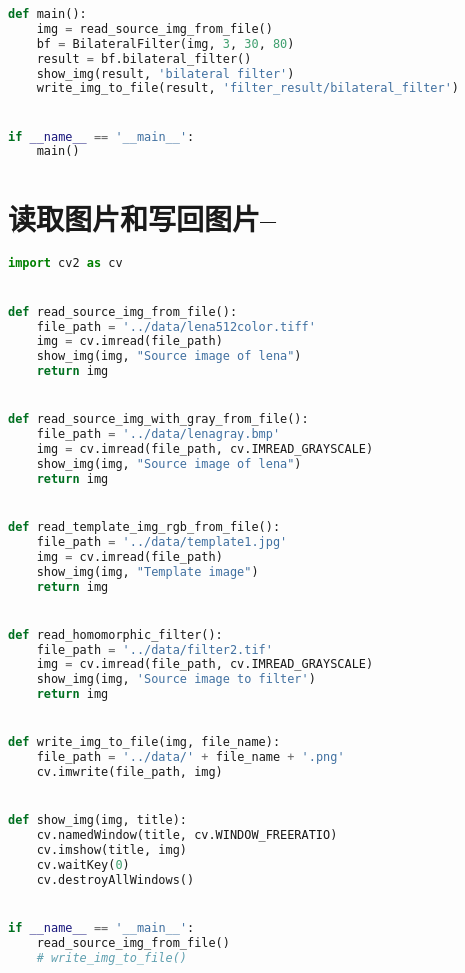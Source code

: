 \documentclass{hitreport}
\begin{document}
\begin{appendices}
\begin{lstlisting}[language=python]
def main():
    img = read_source_img_from_file()
    bf = BilateralFilter(img, 3, 30, 80)
    result = bf.bilateral_filter()
    show_img(result, 'bilateral filter')
    write_img_to_file(result, 'filter_result/bilateral_filter')


if __name__ == '__main__':
    main()

\end{lstlisting}



\section{读取图片和写回图片--}
\begin{lstlisting}[language=python]
import cv2 as cv


def read_source_img_from_file():
    file_path = '../data/lena512color.tiff'
    img = cv.imread(file_path)
    show_img(img, "Source image of lena")
    return img


def read_source_img_with_gray_from_file():
    file_path = '../data/lenagray.bmp'
    img = cv.imread(file_path, cv.IMREAD_GRAYSCALE)
    show_img(img, "Source image of lena")
    return img


def read_template_img_rgb_from_file():
    file_path = '../data/template1.jpg'
    img = cv.imread(file_path)
    show_img(img, "Template image")
    return img


def read_homomorphic_filter():
    file_path = '../data/filter2.tif'
    img = cv.imread(file_path, cv.IMREAD_GRAYSCALE)
    show_img(img, 'Source image to filter')
    return img


def write_img_to_file(img, file_name):
    file_path = '../data/' + file_name + '.png'
    cv.imwrite(file_path, img)


def show_img(img, title):
    cv.namedWindow(title, cv.WINDOW_FREERATIO)
    cv.imshow(title, img)
    cv.waitKey(0)
    cv.destroyAllWindows()


if __name__ == '__main__':
    read_source_img_from_file()
    # write_img_to_file()


\end{lstlisting}

\end{appendices}
\end{document}
